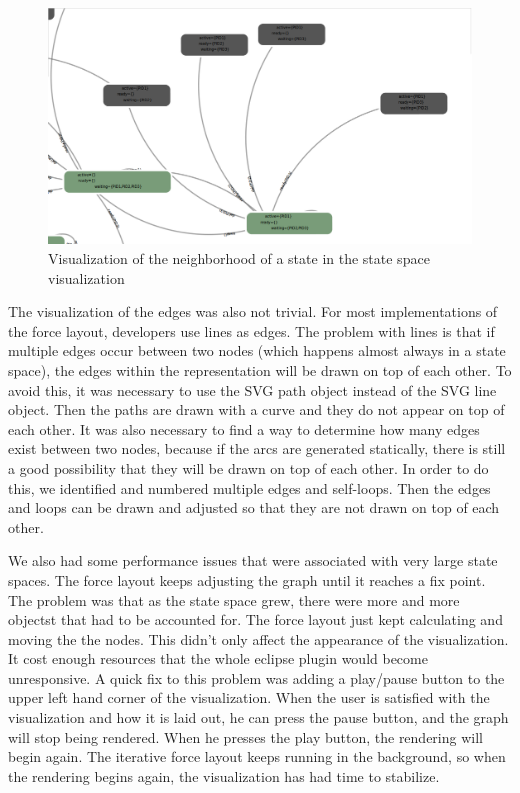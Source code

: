 \begin{figure}[h!]
\centering
\includegraphics[width=15cm]{bilder/ss-neighborhood.png}
\caption{Visualization of the neighborhood of a state in the state space visualization}
\label{neighborhood}
\end{figure}

The visualization of the edges was also not trivial. For most implementations of the force layout, developers use lines as edges. The problem with lines is that if multiple edges occur between two nodes (which happens almost always in a state space), the edges within the representation will be drawn on top of each other. To avoid this, it was necessary to use the SVG path object instead of the SVG line object. Then the paths are drawn with a curve and they do not appear on top of each other. It was also necessary to find a way to determine how many edges exist between two nodes, because if the arcs are generated statically, there is still a good possibility that they will be drawn on top of each other. In order to do this, we identified and numbered multiple edges and self-loops. Then the edges and loops can be drawn and adjusted so that they are not drawn on top of each other.

We also had some performance issues that were associated with very large state spaces. The force layout keeps adjusting the graph until it reaches a fix point. The problem was that as the state space grew, there were more and more objectst that had to be accounted for. The force layout just kept calculating and moving the the nodes. This didn't only affect the appearance of the visualization. It cost enough resources that the whole eclipse plugin would become unresponsive. A quick fix to this problem was adding a play/pause button to the upper left hand corner of the visualization. When the user is satisfied with the visualization and how it is laid out, he can press the pause button, and the graph will stop being rendered. When he presses the play button, the rendering will begin again. The iterative force layout keeps running in the background, so when the rendering begins again, the visualization has had time to stabilize.

